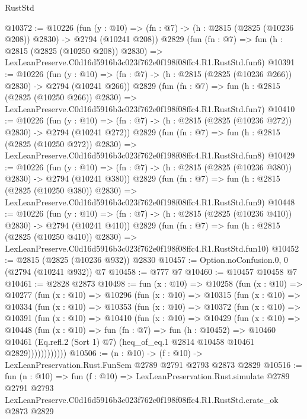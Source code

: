 \begin{lexlean}{RustStd}
\begin{coremodule}
@10372 := @10226
    (fun (y : @10) => (fn : @7) -> (h : @2815 (@2825 (@10236 @208)) @2830) -> @2794 (@10241 @208))
    @2829
    (fun (fn : @7) =>
    fun (h : @2815 (@2825 (@10250 @208)) @2830) =>
    LexLeanPreserve.C0d16d5916b3c023f762e0f198f08ffc4.R1.RustStd.fun6)
@10391 := @10226
    (fun (y : @10) => (fn : @7) -> (h : @2815 (@2825 (@10236 @266)) @2830) -> @2794 (@10241 @266))
    @2829
    (fun (fn : @7) =>
    fun (h : @2815 (@2825 (@10250 @266)) @2830) =>
    LexLeanPreserve.C0d16d5916b3c023f762e0f198f08ffc4.R1.RustStd.fun7)
@10410 := @10226
    (fun (y : @10) => (fn : @7) -> (h : @2815 (@2825 (@10236 @272)) @2830) -> @2794 (@10241 @272))
    @2829
    (fun (fn : @7) =>
    fun (h : @2815 (@2825 (@10250 @272)) @2830) =>
    LexLeanPreserve.C0d16d5916b3c023f762e0f198f08ffc4.R1.RustStd.fun8)
@10429 := @10226
    (fun (y : @10) => (fn : @7) -> (h : @2815 (@2825 (@10236 @380)) @2830) -> @2794 (@10241 @380))
    @2829
    (fun (fn : @7) =>
    fun (h : @2815 (@2825 (@10250 @380)) @2830) =>
    LexLeanPreserve.C0d16d5916b3c023f762e0f198f08ffc4.R1.RustStd.fun9)
@10448 := @10226
    (fun (y : @10) => (fn : @7) -> (h : @2815 (@2825 (@10236 @410)) @2830) -> @2794 (@10241 @410))
    @2829
    (fun (fn : @7) =>
    fun (h : @2815 (@2825 (@10250 @410)) @2830) =>
    LexLeanPreserve.C0d16d5916b3c023f762e0f198f08ffc4.R1.RustStd.fun10)
@10452 := @2815 (@2825 (@10236 @932)) @2830
@10457 := Option.noConfusion.{0, 0} (@2794 (@10241 @932)) @7
@10458 := @777 @7
@10460 := @10457 @10458 @7
@10461 := @2828 @2873
@10498 := fun (x : @10) =>
  @10258
    (fun (x : @10) =>
    @10277
      (fun (x : @10) =>
      @10296
        (fun (x : @10) =>
        @10315
          (fun (x : @10) =>
          @10334
            (fun (x : @10) =>
            @10353
              (fun (x : @10) =>
              @10372
                (fun (x : @10) =>
                @10391
                  (fun (x : @10) =>
                  @10410
                    (fun (x : @10) =>
                    @10429
                      (fun (x : @10) =>
                      @10448
                        (fun (x : @10) =>
                        fun (fn : @7) =>
                        fun (h : @10452) =>
                        @10460
                          @10461
                          (Eq.refl.{2} (Sort 1) @7)
                          (heq_of_eq.{1} @2814 @10458 @10461 @2829))))))))))))
@10506 := (n : @10) -> (f : @10) -> LexLeanPreservation.Rust.FunSem @2789 @2791 @2793 @2873 @2829
@10516 := fun (n : @10) =>
  fun (f : @10) =>
  LexLeanPreservation.Rust.simulate
    @2789
    @2791
    @2793
    LexLeanPreserve.C0d16d5916b3c023f762e0f198f08ffc4.R1.RustStd.crate_ok
    @2873
    @2829
\end{coremodule}
\end{lexlean}

